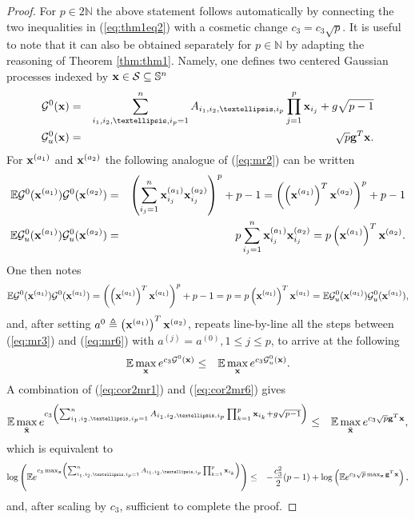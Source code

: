 \documentclass[10pt,a4paper]{amsart}
\def\cG{{\mathcal G}}
\def\cS{{\mathcal S}}
\def\g{{\bf g}}
\def\lp{\left (}
\def\mE{{\mathbb E}}
\def\mN{{\mathbb N}}
\def\mS{{\mathbb S}}
\def\rp{\right )}
\def\x{{\bf x}}
\begin{document}
\begin{proof}
For $p\in2\mN$ the above statement follows automatically by connecting the two inequalities in (\ref{eq:thm1eq2}) with a cosmetic change $c_{3} = c_{3}\sqrt{p}$. It is useful to note that it can also be obtained separately for $p\in\mN$ by adapting the reasoning of Theorem \ref{thm:thm1}. Namely, one defines two centered Gaussian processes indexed by $\x\in\cS \subseteq \mS^n$
  \begin{eqnarray}
\label{eq:cor2mr1}
\cG^0 (\x) & = & \sum_{i_1,i_2,\dots,i_p=1}^n A_{i_1,i_2,\dots,i_p}\prod_{j=1}^{p}\x_{i_j}   + g\sqrt{p-1}  \nonumber   \\
\cG_u^0 (\x) & = &   \sqrt{p} \g^T\x .
  \end{eqnarray}
For $\x^{(a_1)}$ and $\x^{(a_2)} $ the following analogue of (\ref{eq:mr2}) can be written
  \begin{eqnarray}
\label{eq:cor2mr2}
\mE \cG^0 (\x^{(a_1)})\cG^0 (\x^{(a_2)} )   & =  & \lp  \sum_{i_j=1}^n   \x_{i_j}^{(a_1)}  \x_{i_j}^{(a_2)}  \rp^p + p-1
=  \lp \lp \x^{(a_1)} \rp^T\x^{(a_2)} \rp^p + p-1 \nonumber   \\
\mE \cG^0_u (\x^{(a_1)})\cG^0_u (\x^{(a_2)} )   & =  & p \sum_{i_j=1}^n \x_{i_j}^{(a_1)}\x_{i_j}^{(a_2)}
=
p
 \lp \x^{(a_1)} \rp^T\x^{(a_2)}.
  \end{eqnarray}
  One then notes
 \begin{eqnarray}
\label{eq:mr2a}
\mE \cG^0 (\x^{(a_1)})\cG^0 (\x^{(a_1)} )
=  \lp \lp \x^{(a_1)} \rp^T\x^{(a_1)} \rp^p  + p-1
= p = p
 \lp \x^{(a_1)} \rp^T\x^{(a_1)} =
\mE \cG^0_u (\x^{(a_1)})\cG^0_u (\x^{(a_1)} ),
  \end{eqnarray}
and, after setting $a^{0}\triangleq\lp \x^{(a_1)} \rp^T\x^{(a_2)} $, repeats line-by-line all the steps between (\ref{eq:mr3}) and  (\ref{eq:mr6}) with $a^{(j)}=a^{(0)},1\leq j\leq p$, to arrive at the following
\begin{eqnarray}
\label{eq:cor2mr6}
  \mE \max_{\x} e^{c_{3}\cG^0(\x)} &\leq &   \mE \max_{\x} e^{c_{3}\cG^0_u(\x)}.
\end{eqnarray}
A combination of (\ref{eq:cor2mr1}) and (\ref{eq:cor2mr6}) gives
\begin{eqnarray}
\label{eq:cor2mr7}
  \mE \max_{\bar{\x}} e^{c_{3}\lp \sum_{i_1,i_2,\dots,i_p=1}^n A_{i_1,i_2,\dots,i_p}\prod_{k=1}^{p}\x_{i_k}   + g\sqrt{p-1}   \rp  } &\leq &   \mE \max_{\bar{\x}} e^{c_{3} \sqrt{p} \g^T\x   },
  \end{eqnarray}
which is equivalent to
 \begin{eqnarray}
\label{eq:cor2mr9}
   \log \lp \mE e^{c_{3} \max_{\x}  \lp \sum_{i_1,i_2,\dots,i_p=1}^n A_{i_1,i_2,\dots,i_p}\prod_{k=1}^{p}\x_{i_k}    \rp  }
   \rp
   &\leq &
   -\frac{c_{3}^2}{2}(p-1) + \log \lp
    \mE e^{c_{3} \sqrt{p}  \max_{\x}  \g^T\x   }
    \rp,
\end{eqnarray}
and, after scaling by $c_3$, sufficient to complete the proof.



 \end{proof}
\end{document}
